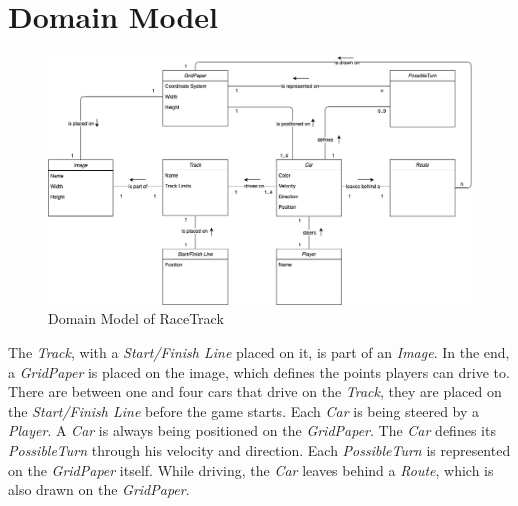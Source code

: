 \section{Domain Model}
    \begin{figure}[H]
        \centering
        \includegraphics[width=18cm,keepaspectratio,center]{img/Domain-Model.png}
        \caption{Domain Model of RaceTrack}
    \end{figure}

    The \textit{\gls{Track}}, with a \textit{\gls{Start/Finish Line}} placed on it, is part of an \textit{\gls{Image}}. In the end, a \textit{\gls{GridPaper}} is placed on the image, which defines the points players can drive to. There are between one and four cars that drive on the \textit{Track}, they are placed on the \textit{\gls{Start/Finish Line}} before the game starts. Each \textit{\gls{Car}} is being steered by a \textit{\gls{Player}}. A \textit{Car} is always being positioned on the \textit{GridPaper}. The \textit{Car} defines its \textit{\gls{PossibleTurn}} through his velocity and direction. Each \textit{PossibleTurn} is represented on the \textit{GridPaper} itself. While driving, the \textit{Car} leaves behind a \textit{\gls{Route}}, which is also drawn on the \textit{GridPaper}.